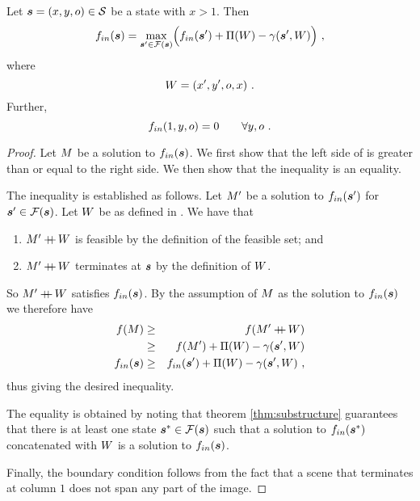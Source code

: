 \begin{corollary}
  \label{cor:first-recurrence}
  Let $\State=(x,y,\WallOrient)\in\StateSpace$ be a state with
  $x>1$. Then
  \begin{equation}
    \label{eq:first-recurrence}
    \SubProbIN(\State) = 
    \max_{\State'\in\FeasibleSet(\State)}\limits
    \Bigl( 
      \SubProbIN(\State') + \WallPayoff(\Wall) - \CornerPenalty(\State',\Wall)
    \Bigr) ~,
  \end{equation}
  where
  \begin{equation}
    \label{eq:wall-def}
    \Wall=(x',y',\WallOrient,x) ~.
  \end{equation}
  Further,
  \begin{equation}
    \label{eq:first-boundary}
    \SubProbIN(1,y,\WallOrient) = 0 \quad\quad \forall y,\WallOrient ~.
  \end{equation}
\end{corollary}
\begin{proof}
  Let $\Scene$ be a solution to $\SubProbIN(\State)$. We first show
  that the left side of  is greater than or
  equal to the right side. We then show that the inequality is an
  equality.

  The inequality is established as follows. Let $\Scene'$ be a
  solution to $\SubProbIN(\State')$ for
  $\State'\in\FeasibleSet(\State)$. Let $\Wall$ be as defined in
  . We have that
  \begin{enumerate}
    \item{$\Scene'\concat\Wall$ is feasible by the definition of the
      feasible set; and}
    \item{$\Scene'\concat\Wall$ terminates at $\State$ by the definition
      of $\Wall$.}
  \end{enumerate}
  So $\Scene'\concat\Wall$ satisfies $\SubProbIN(\State)$. By the
  assumption of $\Scene$ as the solution to $\SubProbIN(\State)$ we
  therefore have
  \begin{eqnarray}
    \Objective(\Scene)
      &\geq&
    \Objective(\Scene'\concat\Wall)\\
      &\geq&
    \Objective(\Scene') + \WallPayoff(\Wall) -
    \CornerPenalty(\State',\Wall)\\
    \SubProbIN(\State)
      &\geq&
    \SubProbIN(\State') + \WallPayoff(\Wall) -
    \CornerPenalty(\State',\Wall) ~,
  \end{eqnarray}
  thus giving the desired inequality.

  The equality is obtained by noting that theorem
  \ref{thm:substructure} guarantees that there is at least one state
  $\State^*\in\FeasibleSet(\State)$ such that a solution to
  $\SubProbIN(\State^*)$ concatenated with $\Wall$ is a solution to
  $\SubProbIN(\State)$.

  Finally, the boundary condition  follows from
  the fact that a scene that terminates at column $1$ does not span
  any part of the image.
\end{proof}

